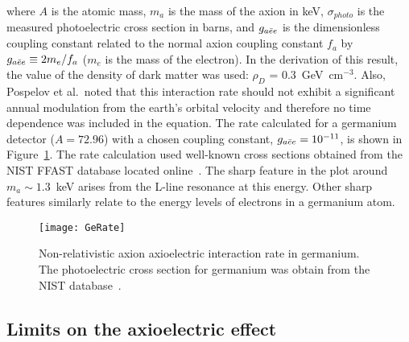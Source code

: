 where $A$ is the atomic mass, $m_{a}$ is the mass of the axion in keV, $\sigma_{photo}$ is the measured photoelectric cross section in barns, and $g_{a\bar{e}e}$ is the dimensionless coupling constant related to the normal axion coupling constant $f_{a}$ by $g_{a\bar{e}e} \equiv 2 m_{e}/ f_{a}$ ($m_{e}$ is the mass of the electron).  In the derivation of this result, the value of the density of dark matter was used: $\rho_{D}$ = 0.3~GeV~cm$^{-3}$.  Also, Pospelov et al.~noted that this interaction rate should not exhibit a significant annual modulation from the earth's orbital velocity and therefore no time dependence was included in the equation.  The rate calculated for a germanium detector ($A=72.96$) with a chosen coupling constant, $g_{a\bar{e}e} = 10^{-11}$, is shown in Figure~\ref{fig:HeavyAxionSignalRate}.  The rate calculation used well-known cross sections obtained from the NIST FFAST database located online~\cite{chantler:597}.  The sharp feature in the plot around $m_{a}\sim1.3$~keV arises from the L-line resonance at this energy.  Other sharp features similarly relate to the energy levels of electrons in a germanium atom.  



		\begin{figure}
			\centering
			\texttt{[image: GeRate]}
			\caption[Axioelectric interaction rate in germanium]{Non-relativistic axion axioelectric 
			interaction rate in germanium.  The photoelectric cross section for germanium was obtain
			from the NIST database~\cite{chantler:597}.}
			\label{fig:HeavyAxionSignalRate}
		\end{figure}

	\subsection{Limits on the axioelectric effect}
	\label{sec:CalcLimitsOnHeavyAxionLimits}		
		
